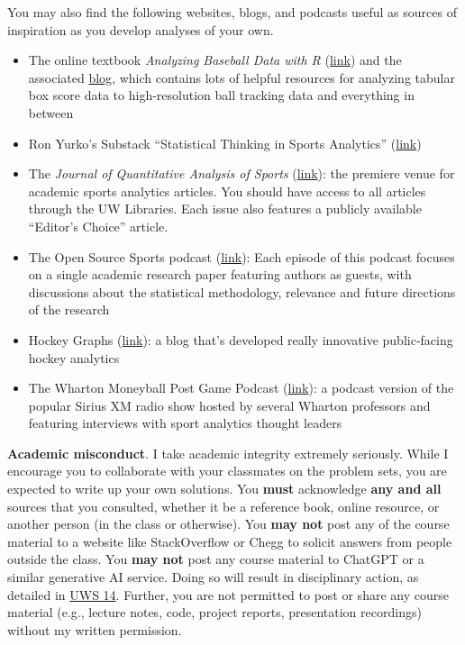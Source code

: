 \documentclass[11pt]{article}
\begin{document}
You may also find the following websites, blogs, and podcasts useful as sources of inspiration as you develop analyses of your own.

\begin{itemize}
\item{The online textbook \textit{Analyzing Baseball Data with R} (\href{https://beanumber.github.io/abdwr3e/}{link}) and the associated \href{https://baseballwithr.wordpress.com}{blog}, which contains lots of helpful resources for analyzing tabular box score data to high-resolution ball tracking data and everything in between}
\item{Ron Yurko's Substack ``Statistical Thinking in Sports Analytics'' (\href{https://statthinksportsanalytics.substack.com}{link})}
\item{The \textit{Journal of Quantitative Analysis of Sports} (\href{https://www.degruyter.com/journal/key/jqas/html?lang=en&srsltid=AfmBOoqvNglsW_tIa2IHQ4uaPHDGblGz1zYkSjhFjVazKZUzFFg3mnhp}{link}): the premiere venue for academic sports analytics articles. You should have access to all articles through the UW Libraries. Each issue also features a publicly available ``Editor's Choice'' article.}
\item{The Open Source Sports podcast (\href{https://open.spotify.com/show/3vTtH2JJXbjrzOtEfjrqc4}{link}): Each episode of this podcast focuses on a single academic research paper featuring authors as guests, with discussions about the statistical methodology, relevance and future directions of the research}
\item{Hockey Graphs (\href{https://hockey-graphs.com}{link}): a blog that's developed really innovative public-facing hockey analytics}
\item{The Wharton Moneyball Post Game Podcast (\href{https://knowledge.wharton.upenn.edu/shows/moneyball-highlights/}{link}): a podcast version of the popular Sirius XM radio show hosted by several Wharton professors and featuring interviews with sport analytics thought leaders}
\end{itemize}

\newpage

\textbf{Academic misconduct}. I take academic integrity extremely seriously. While I encourage you to collaborate with your classmates on the problem sets, you are expected to write up your own solutions. 
You \textbf{must} acknowledge \textbf{any and all} sources that you consulted, whether it be a reference book, online resource, or another person (in the class or otherwise). 
You \textbf{may not} post any of the course material to a website like StackOverflow or Chegg to solicit answers from people outside the class. 
You \textbf{may not} post any course material to ChatGPT or a similar generative AI service. 
Doing so will result in disciplinary action, as detailed in \href{https://docs.legis.wisconsin.gov/code/admin_code/uws/14}{UWS 14}. 
Further, you are not permitted to post or share any course material (e.g., lecture notes, code, project reports, presentation recordings) without my written permission.
\end{document}
